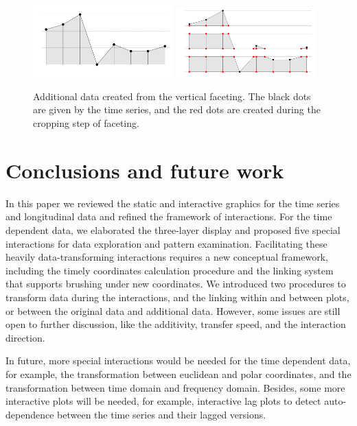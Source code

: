 \documentclass[12pt]{article}
\begin{document}
\begin{itemize}
\begin{center}
\begin{figure}[htp]
\begin{centering}
\includegraphics[width=0.48\textwidth]{graph/pipeline-23-1}
\includegraphics[width=0.48\textwidth]{graph/pipeline-23-2}
\end{centering}
\caption{\label{fig:Additional-data}Additional data created from the vertical
faceting. The black dots are given by the time series, and the red
dots are created during the cropping step of faceting.}
\end{figure}
\end{center}

\end{itemize}

\section{Conclusions and future work}

In this paper we reviewed the static and interactive graphics for
the time series and longitudinal data and refined the framework of
interactions. For the time dependent data, we elaborated the
three-layer display and proposed five special interactions for data
exploration and pattern examination. Facilitating these heavily
data-transforming interactions requires a new conceptual framework,
including the timely coordinates calculation procedure and
the linking system that supports brushing under new coordinates.
We introduced two procedures to transform data during the
interactions, and the linking within and between plots, or
between the original data and additional data.
However, some issues are still open to further discussion,
like the additivity, transfer speed, and the interaction direction.

In future, more special interactions would be needed for the time
dependent data, for example, the transformation between euclidean
and polar coordinates, and the transformation between time domain
and frequency domain. Besides, some more interactive plots will
be needed, for example, interactive lag plots to detect auto-dependence
between the time series and their lagged versions.
\end{document}

